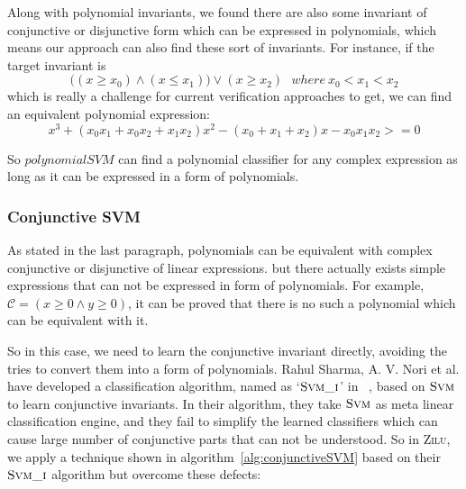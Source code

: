Along with polynomial invariants, we found there are also some invariant of conjunctive or disjunctive form which can be expressed in polynomials,
which means our approach can also find these sort of invariants.
For instance, if the target invariant is 
$$\big((x \ge x_0) \wedge (x \le x_1)\big) \vee (x \ge x_2) ~~~where\ x_0 < x_1 < x_2$$
which is really a challenge for current verification approaches to get,
we can find an equivalent polynomial expression:
$$x^3 + (x_0x_1 + x_0x_2 + x_1x_2)x^2 - (x_0 + x_1 + x_2)x - x_0x_1x_2 >= 0$$

So $polynomialSVM$ can find a polynomial classifier for any complex expression as long as it can be expressed in a form of polynomials.


\subsubsection{Conjunctive SVM}
As stated in the last paragraph, polynomials can be equivalent with complex conjunctive or disjunctive of linear expressions.
but there actually exists simple expressions that can not be expressed in form of polynomials.
For example, $\mathcal{C} = (x \ge 0 \wedge y \ge 0)$,
it can be proved that there is no such a polynomial which can be equivalent with it.

So in this case, we need to learn the conjunctive invariant directly, avoiding the tries to convert them into a form of polynomials.
Rahul Sharma, A. V. Nori et al. have developed a classification algorithm, named as `$\textsc{Svm\_i}$' in ~\cite{sharma2012interpolants},
based on $\textsc{Svm}$ to learn conjunctive invariants.
In their algorithm, they take $\textsc{Svm}$ as meta linear classification engine, 
and they fail to simplify the learned classifiers which can cause large number of conjunctive parts that can not be understood.
So in \textsc{Zilu}, we apply a technique shown in algorithm~\ref{alg:conjunctiveSVM} based on their $\textsc{Svm\_i}$ algorithm but overcome these defects:

